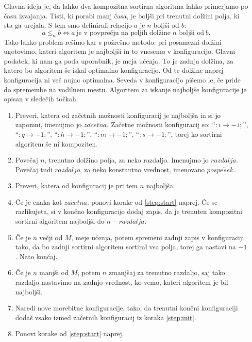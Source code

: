\documentclass[a4paper,oneside,12pt]{article}
\newcommand{\lra}{\ensuremath{\longrightarrow}}
\begin{document}
Glavna ideja je, da lahko
dva kompozitna sortirna algoritma lahko primerjamo po času izvajanja. Tisti, ki porabi manj
časa, je boljši pri trenutni dolžini polja, ki sta ga urejala.
S tem smo definirali relacijo $a$ je $n$ boljši od $b$:
\[ a \leq_n b \Leftrightarrow a\ \text{je v povprečju na poljih dolžine $n$ boljši
od}\ b.\]
Tako lahko problem rešimo kar s požrešno metodo: 
pri posamezni dolžini ugotovimo, kateri algoritem je najboljši in to vnesemo
v konfiguracijo. Glavni podatek, ki nam ga poda uporabnik, je meja učenja. To je zadnja
dolžina, za katero bo algoritem še iskal optimalno konfiguracijo. Od te dolžine naprej
konfiguracija ni več nujno optimalna. Seveda v konfiguracijo pišemo le, če pride do 
spremembe na vodilnem mestu. Algoritem za iskanje najboljše konfiguracije je opisan v
sledečih točkah.
\begin{enumerate}
  \item \label{step:init}Preveri, katera od začetnih možnosti konfiguracij je najboljša in
    si jo zapomni, imenujmo jo $za\check{c}etna$. Začetne možnosti konfiguracij so:
    ``$:i \lra -1;$'', ``$:q \lra -1;$'', ``$:h \lra -1;$'',
    ``$:m \lra -1;$'', ``$:s \lra -1;$'', torej ko sortirni algoritem še ni kompoziten.
  \item \label{step:start}Povečaj $n$, trenutno dolžino polja, za neko razdaljo. Imenujmo
    jo $razdalja$. Povečaj tudi $razdaljo$, za neko konstantno vrednost, imenovano
    $pospe\check{s}ek$.
  \item Preveri, katera od konfiguracij je pri tem $n$ najboljša.
  \item \label{step:check}Če je enaka kot $za\check{c}etna$, ponovi korake od \ref{step:start} 
    naprej. Če se razlikujeta, si v končno konfiguracijo dodaj zapis, da je
    trenuten kompozitni sortirni algoritem najboljši do $n - razdalja$.
  \item Če je $n$ večji od $M$, meje učenja, potem spremeni zadnji zapis v konfiguraciji
    tako, da bo zadnji sortirni algoritem sortiral vsa polja, torej ga nastavi na $-1$.
    Nato končaj.
  \item Če je $n$ manjši od $M$, potem $n$ zmanjšaj za trenutno razdaljo, saj
    tako razdaljo nastavimo na zadnjo vrednost, ko vemo, kateri algoritem je bil
    najboljši.
  \item Naredi nove morebitne konfiguracije, tako, da trenutni končni konfiguraciji dodaš
    vsako izmed začetnih konfiguracij iz koraka \ref{step:init}.
  \item Ponovi korake od \ref{step:start} naprej.
\end{enumerate}
\end{document}
